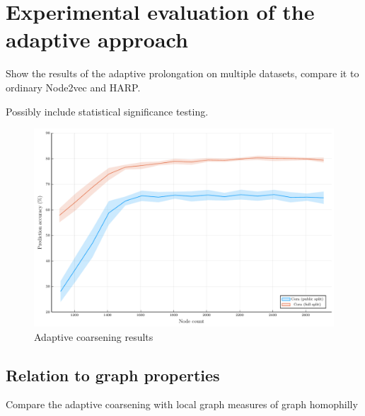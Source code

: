 \section{Experimental evaluation of the adaptive approach}
Show the results of the adaptive prolongation on multiple datasets, compare it to ordinary Node2vec and HARP.

Possibly include statistical significance testing.

\begin{figure}
  \centering
  \includegraphics[width=\linewidth]{images/adaptive-coarsening/adaptive-coarsening.pdf}
  \caption{Adaptive coarsening results}
  \label{fig:harp-overview}
\end{figure}

\subsection{Relation to graph properties}

Compare the adaptive coarsening with local graph measures of graph homophilly
